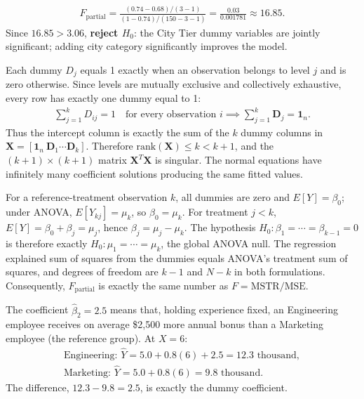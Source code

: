 \begin{solproblema}[prob:5652f5a]
\begin{align}
F_{\text{partial}}=\frac{(0.74-0.68)/(3-1)}{(1-0.74)/(150-3-1)}=\frac{0.03}{0.001781}\approx16.85.
\end{align}
Since $16.85>3.06$, \textbf{reject $H_0$}: the City Tier dummy variables are jointly significant; adding city category significantly improves the model.
\end{solproblema}

\begin{solproblema}[prob:43c3e82]
Each dummy $D_j$ equals 1 exactly when an observation belongs to level $j$ and is zero otherwise. Since levels are mutually exclusive and collectively exhaustive, every row has exactly one dummy equal to 1:
\begin{align}
\sum_{j=1}^kD_{ij}=1\quad\text{for every observation }i\implies\sum_{j=1}^k\mathbf D_j=\mathbf1_n.
\end{align}
Thus the intercept column is exactly the sum of the $k$ dummy columns in $\mathbf X=[\mathbf1_n\ \mathbf D_1\cdots\mathbf D_k]$. Therefore $\text{rank}(\mathbf X)\le k<k+1$, and the $(k+1)\times(k+1)$ matrix $\mathbf X^T\mathbf X$ is singular. The normal equations have infinitely many coefficient solutions producing the same fitted values.
\end{solproblema}

\begin{solproblema}[prob:a61b69d]
For a reference-treatment observation $k$, all dummies are zero and $E[Y]=\beta_0$; under ANOVA, $E[Y_{kj}]=\mu_k$, so $\beta_0=\mu_k$. For treatment $j<k$, $E[Y]=\beta_0+\beta_j=\mu_j$, hence $\beta_j=\mu_j-\mu_k$. The hypothesis $H_0:\beta_1=\cdots=\beta_{k-1}=0$ is therefore exactly $H_0:\mu_1=\cdots=\mu_k$, the global ANOVA null. The regression explained sum of squares from the dummies equals ANOVA's treatment sum of squares, and degrees of freedom are $k-1$ and $N-k$ in both formulations. Consequently, $F_{\text{partial}}$ is exactly the same number as $F=\text{MSTR}/\text{MSE}$.
\end{solproblema}

\begin{solproblema}
The coefficient $\hat\beta_2=2.5$ means that, holding experience fixed, an Engineering employee receives on average \$2,500 more annual bonus than a Marketing employee (the reference group). At $X=6$:
\begin{align}
\text{Engineering: }\hat Y=5.0+0.8(6)+2.5=12.3\text{ thousand},\\
\text{Marketing: }\hat Y=5.0+0.8(6)=9.8\text{ thousand}.
\end{align}
The difference, $12.3-9.8=2.5$, is exactly the dummy coefficient.
\end{solproblema}
